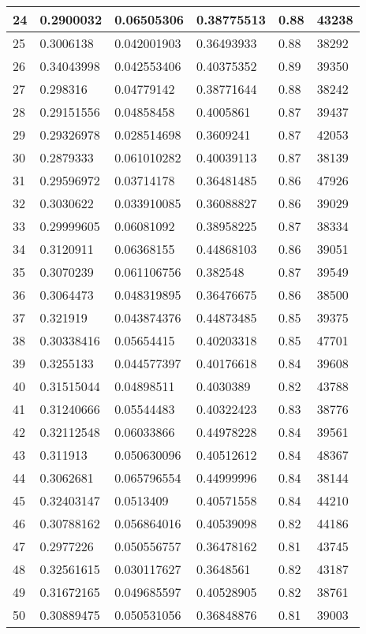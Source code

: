 \begin{longtable}{|l|l|l|l|l|l|}
24 & 0.2900032 & 0.06505306 & 0.38775513 & 0.88 & 43238 \\ \hline 
25 & 0.3006138 & 0.042001903 & 0.36493933 & 0.88 & 38292 \\ \hline 
26 & 0.34043998 & 0.042553406 & 0.40375352 & 0.89 & 39350 \\ \hline 
27 & 0.298316 & 0.04779142 & 0.38771644 & 0.88 & 38242 \\ \hline 
28 & 0.29151556 & 0.04858458 & 0.4005861 & 0.87 & 39437 \\ \hline 
29 & 0.29326978 & 0.028514698 & 0.3609241 & 0.87 & 42053 \\ \hline 
30 & 0.2879333 & 0.061010282 & 0.40039113 & 0.87 & 38139 \\ \hline 
31 & 0.29596972 & 0.03714178 & 0.36481485 & 0.86 & 47926 \\ \hline 
32 & 0.3030622 & 0.033910085 & 0.36088827 & 0.86 & 39029 \\ \hline 
33 & 0.29999605 & 0.06081092 & 0.38958225 & 0.87 & 38334 \\ \hline 
34 & 0.3120911 & 0.06368155 & 0.44868103 & 0.86 & 39051 \\ \hline 
35 & 0.3070239 & 0.061106756 & 0.382548 & 0.87 & 39549 \\ \hline 
36 & 0.3064473 & 0.048319895 & 0.36476675 & 0.86 & 38500 \\ \hline 
37 & 0.321919 & 0.043874376 & 0.44873485 & 0.85 & 39375 \\ \hline 
38 & 0.30338416 & 0.05654415 & 0.40203318 & 0.85 & 47701 \\ \hline 
39 & 0.3255133 & 0.044577397 & 0.40176618 & 0.84 & 39608 \\ \hline 
40 & 0.31515044 & 0.04898511 & 0.4030389 & 0.82 & 43788 \\ \hline 
41 & 0.31240666 & 0.05544483 & 0.40322423 & 0.83 & 38776 \\ \hline 
42 & 0.32112548 & 0.06033866 & 0.44978228 & 0.84 & 39561 \\ \hline 
43 & 0.311913 & 0.050630096 & 0.40512612 & 0.84 & 48367 \\ \hline 
44 & 0.3062681 & 0.065796554 & 0.44999996 & 0.84 & 38144 \\ \hline 
45 & 0.32403147 & 0.0513409 & 0.40571558 & 0.84 & 44210 \\ \hline 
46 & 0.30788162 & 0.056864016 & 0.40539098 & 0.82 & 44186 \\ \hline 
47 & 0.2977226 & 0.050556757 & 0.36478162 & 0.81 & 43745 \\ \hline 
48 & 0.32561615 & 0.030117627 & 0.3648561 & 0.82 & 43187 \\ \hline 
49 & 0.31672165 & 0.049685597 & 0.40528905 & 0.82 & 38761 \\ \hline 
50 & 0.30889475 & 0.050531056 & 0.36848876 & 0.81 & 39003 \\ \hline 
\end{longtable}